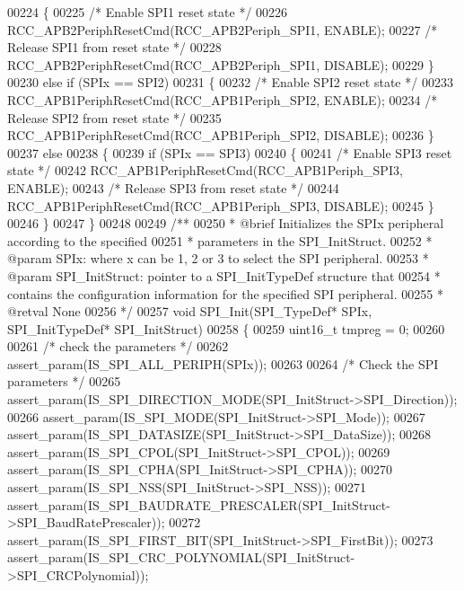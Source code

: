 \begin{DoxyCode}
00224   \{
00225     \textcolor{comment}{/* Enable SPI1 reset state */}
00226     RCC_APB2PeriphResetCmd(RCC_APB2Periph_SPI1, ENABLE);
00227     \textcolor{comment}{/* Release SPI1 from reset state */}
00228     RCC_APB2PeriphResetCmd(RCC_APB2Periph_SPI1, DISABLE);
00229   \}
00230   \textcolor{keywordflow}{else} \textcolor{keywordflow}{if} (SPIx == SPI2)
00231   \{
00232     \textcolor{comment}{/* Enable SPI2 reset state */}
00233     RCC_APB1PeriphResetCmd(RCC_APB1Periph_SPI2, ENABLE);
00234     \textcolor{comment}{/* Release SPI2 from reset state */}
00235     RCC_APB1PeriphResetCmd(RCC_APB1Periph_SPI2, DISABLE);
00236     \}
00237   \textcolor{keywordflow}{else}
00238   \{
00239     \textcolor{keywordflow}{if} (SPIx == SPI3)
00240     \{
00241       \textcolor{comment}{/* Enable SPI3 reset state */}
00242       RCC_APB1PeriphResetCmd(RCC_APB1Periph_SPI3, ENABLE);
00243       \textcolor{comment}{/* Release SPI3 from reset state */}
00244       RCC_APB1PeriphResetCmd(RCC_APB1Periph_SPI3, DISABLE);
00245     \}
00246   \}
00247 \}
00248 
00249 \textcolor{comment}{/**}
00250 \textcolor{comment}{  * @brief  Initializes the SPIx peripheral according to the specified }
00251 \textcolor{comment}{  *         parameters in the SPI\_InitStruct.}
00252 \textcolor{comment}{  * @param  SPIx: where x can be 1, 2 or 3 to select the SPI peripheral.}
00253 \textcolor{comment}{  * @param  SPI\_InitStruct: pointer to a SPI\_InitTypeDef structure that}
00254 \textcolor{comment}{  *         contains the configuration information for the specified SPI peripheral.}
00255 \textcolor{comment}{  * @retval None}
00256 \textcolor{comment}{  */}
00257 \textcolor{keywordtype}{void} SPI_Init(SPI\_TypeDef* SPIx, SPI\_InitTypeDef* SPI\_InitStruct)
00258 \{
00259   uint16\_t tmpreg = 0;
00260 
00261   \textcolor{comment}{/* check the parameters */}
00262   assert_param(IS\_SPI\_ALL\_PERIPH(SPIx));
00263 
00264   \textcolor{comment}{/* Check the SPI parameters */}
00265   assert_param(IS\_SPI\_DIRECTION\_MODE(SPI\_InitStruct->SPI\_Direction));
00266   assert_param(IS\_SPI\_MODE(SPI\_InitStruct->SPI\_Mode));
00267   assert_param(IS\_SPI\_DATASIZE(SPI\_InitStruct->SPI\_DataSize));
00268   assert_param(IS\_SPI\_CPOL(SPI\_InitStruct->SPI\_CPOL));
00269   assert_param(IS\_SPI\_CPHA(SPI\_InitStruct->SPI\_CPHA));
00270   assert_param(IS\_SPI\_NSS(SPI\_InitStruct->SPI\_NSS));
00271   assert_param(IS\_SPI\_BAUDRATE\_PRESCALER(SPI\_InitStruct->SPI\_BaudRatePrescaler));
00272   assert_param(IS\_SPI\_FIRST\_BIT(SPI\_InitStruct->SPI\_FirstBit));
00273   assert_param(IS\_SPI\_CRC\_POLYNOMIAL(SPI\_InitStruct->SPI\_CRCPolynomial));

\end{DoxyCode}
